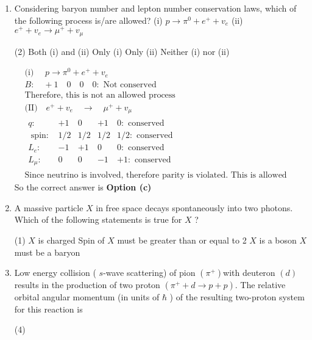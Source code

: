 \begin{enumerate}
	\item  Considering baryon number and lepton number conservation laws, which of the following process is/are allowed?
	(i) $p \rightarrow \pi^0+e^{+}+v_e$\hspace{2cm}
	(ii) $e^{+}+v_e \rightarrow \mu^{+}+v_\mu$
	{}
	 \begin{tasks}(2)
		\task[\textbf{a.}]Both (i) and (ii)
		\task[\textbf{b.}]Only (i)
		\task[\textbf{c.}]Only (ii)
		\task[\textbf{d.}]Neither (i) nor (ii)
	\end{tasks}
\begin{answer}
	\begin{align*}
	 &\text{(i) }\quad p \rightarrow \pi^0+e^{+}+v_e\\
	&B: \quad+1 \quad 0 \quad 0 \quad 0:\text{ Not conserved}\\ 
	&\text{Therefore, this is not an allowed process}\\
	&\text{(II)}\quad e^{+}+v_e \quad \rightarrow \quad \mu^{+}+v_\mu\\
	&\begin{array}{lclcc}
	q: & +1 & 0 & +1 & 0: \text { conserved } \\
	\text { spin: } & 1 / 2 & 1 / 2 & 1 / 2 & 1 / 2: \text { conserved } \\
	L_e: & -1 & +1 & 0 & 0: \text { conserved } \\
	L_\mu: & 0 & 0 & -1 & +1: \text { conserved }
	\end{array}\\
	&\text{Since neutrino is involved, therefore parity is violated. This is allowed through weak interaction.}
	\end{align*}
		So the correct answer is \textbf{Option (c)}
\end{answer}
	\item  A massive particle $X$ in free space decays spontaneously into two photons. Which of the following statements is true for $X$ ?
{}
	 \begin{tasks}(1)
		\task[\textbf{a.}] $X$ is charged
		\task[\textbf{b.}]Spin of $X$ must be greater than or equal to 2
		\task[\textbf{c.}]$X$ is a boson
		\task[\textbf{d.}]$X$ must be a baryon 
	\end{tasks}

	\item  Low energy collision ( $s$-wave scattering) of pion $\left(\pi^{+}\right)$with deuteron $(d)$ results in the production of two proton $\left(\pi^{+}+d \rightarrow p+p\right)$. The relative orbital angular momentum (in units of $\hbar$ ) of the resulting two-proton system for this reaction is
	{}
	 \begin{tasks}(4)
	\end{tasks}


\end{enumerate}

